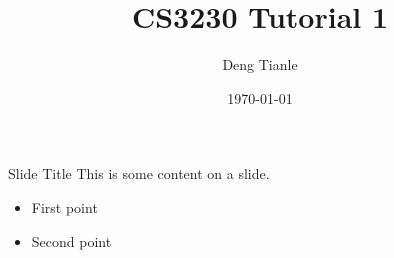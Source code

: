 \documentclass{beamer}
\title{CS3230 Tutorial 1}
\author{Deng Tianle}
\date{\today}
\begin{document}
\frame{\titlepage} 

\begin{frame}{Slide Title}
  This is some content on a slide.

  \begin{itemize}
    \item First point
    \item Second point
  \end{itemize}
\end{frame}
\end{document}
